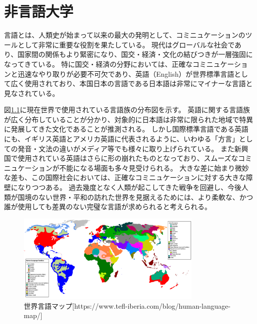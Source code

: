 \chapter{非言語大学}
\label{sec:HigengoUniv}

言語とは、人類史が始まって以来の最大の発明として、コミニュケーションのツールとして非常に重要な役割を果たしている。
現代はグローバルな社会であり、国家間の関係もより緊密になり、国交・経済・文化の結びつきが一層強固になってきている。
特に国交・経済の分野においては、正確なコミニュケーションと迅速なやり取りが必要不可欠であり、英語（English）が世界標準言語として広く使用されており、本国日本の言語である日本語は非常にマイナーな言語と見なされている。

図\ref{Fig:LanguageMap}に現在世界で使用されている言語族の分布図を示す。
英語に関する言語族が広く分布していることが分かり、対象的に日本語は非常に限られた地域で特異に発展してきた文化であることが推測される。
しかし国際標準言語である英語にも、イギリス英語とアメリカ英語に代表されるように、いわゆる「方言」としての発音・文法の違いがメディア等でも様々に取り上げられている。
また新興国で使用されている英語はさらに形の崩れたものとなっており、スムーズなコミニュケーションが不能になる場面も多々見受けられる。
大きな差に始まり微妙な差も、この国際社会においては、正確なコミニュケーションに対する大きな障壁になりつつある。
過去幾度となく人類が起こしてきた戦争を回避し、今後人類が国境のない世界・平和の訪れた世界を見据えるためには、より柔軟な、かつ誰が使用しても差異のない完璧な言語が求められると考えられる。

\begin{figure}[h]
\centering
\includegraphics[width=0.8\textwidth]{./section/HigengoUniv/figures/Human_Language_Families_Map.png}
\caption{世界言語マップ[https://www.tefl-iberia.com/blog/human-language-map/]}
\label{Fig:LanguageMap}
\end{figure}

